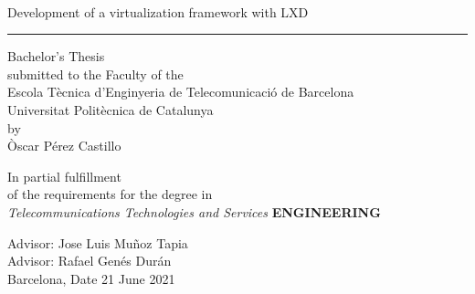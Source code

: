 \thispagestyle{empty}
\begin{center}
    {\sffamily
        \\
        \vspace{1cm}
        {\Huge Development of a virtualization framework with LXD}\\
        \vspace{0.5cm}
        {\color{black}\hrule height 1pt}
        \vspace{1cm}
        {\large{Bachelor's Thesis \\
		submitted to the Faculty of the \\
                Escola T\`ecnica d'Enginyeria de Telecomunicaci\'o de Barcelona \\
                Universitat Polit\`ecnica de Catalunya \\
                by \\
                \vspace{0.5cm}
                Òscar Pérez Castillo}}

        \vspace{1.5cm}

        {In partial fulfillment\\
            of the requirements for the degree in\\
            \textit{Telecommunications Technologies and Services} \textbf{ENGINEERING}}

        \vspace{2cm}

        {{Advisor: Jose Luis Muñoz Tapia\\}}
        {{Advisor: Rafael Genés Durán\\}}
        {{Barcelona, Date 21 June 2021}}

        \vspace{2cm}

        \thispagestyle{alim}
    }

\end{center}

